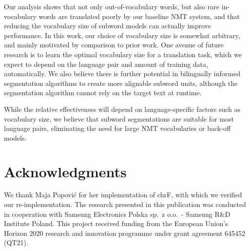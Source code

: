 \documentclass[11pt]{article}
\begin{document}
Our analysis shows that not only out-of-vocabulary words, but also rare in-vocabulary words are translated poorly by our baseline NMT system,
and that reducing the vocabulary size of subword models can actually improve performance.
In this work, our choice of vocabulary size is somewhat arbitrary, and mainly motivated by comparison to prior work.
One avenue of future research is to learn the optimal vocabulary size for a translation task, which we expect to depend on the language pair and amount of training data, automatically.
We also believe there is further potential in bilingually informed segmentation algorithms to create more alignable subword units, although the segmentation algorithm cannot rely on the target text at runtime.

While the relative effectiveness will depend on language-specific factors such as vocabulary size, we believe that subword segmentations are suitable for most language pairs, eliminating the need for large NMT vocabularies or back-off models.

\section*{Acknowledgments}

We thank Maja Popović for her implementation of {\sc chrF}, with which we verified our re-implementation.
The research presented in this publication was conducted in cooperation with Samsung Electronics Polska sp.\ z o.o.\ - Samsung R\&D Institute Poland.
This project received funding from the European Union's Horizon 2020 research and innovation programme under grant agreement 645452 (QT21).



\end{document}
